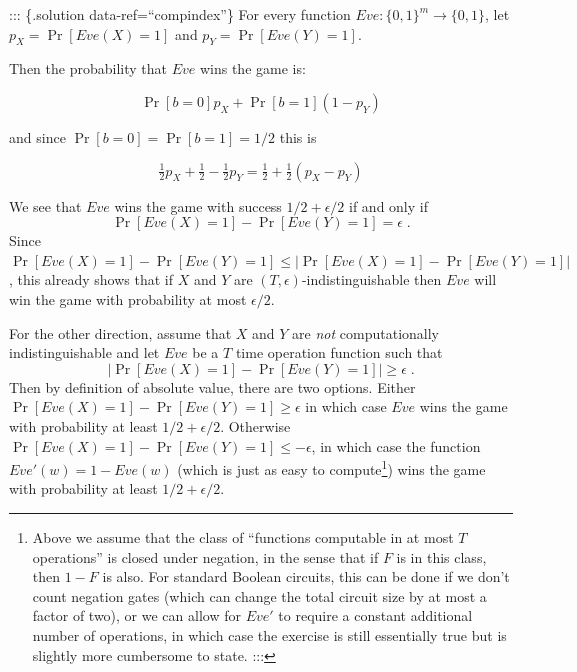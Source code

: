 
::: \{.solution data-ref=``compindex''\} For every function
\(Eve:\{0,1\}^m \rightarrow \{0,1\}\), let \(p_X = \Pr[ Eve(X)=1]\) and
\(p_Y = \Pr[Eve(Y)=1]\).

Then the probability that \(Eve\) wins the game is:

\begin{equation*}
\Pr[ b=0] p_X + \Pr[b=1](1-p_Y)
\end{equation*}

and since \(\Pr[b=0]=\Pr[b=1]=1/2\) this is

\begin{equation*}
\tfrac{1}{2}p_X + \tfrac{1}{2} - \tfrac{1}{2}p_Y = \tfrac{1}{2} + \tfrac{1}{2}(p_X-p_Y)
\end{equation*}

We see that \(Eve\) wins the game with success \(1/2 + \epsilon/2\) if
and only if
\begin{equation*}
\Pr[ Eve(X) = 1 ] - \Pr[Eve(Y)=1]  = \epsilon \;.
\end{equation*}
Since
\(\Pr[ Eve(X) = 1 ] - \Pr[Eve(Y)=1] \leq \left| \Pr[ Eve(X) = 1 ] - \Pr[Eve(Y)=1] \right|\),
this already shows that if \(X\) and \(Y\) are
\((T,\epsilon)\)-indistinguishable then \(Eve\) will win the game with
probability at most \(\epsilon/2\).

For the other direction, assume that \(X\) and \(Y\) are \emph{not}
computationally indistinguishable and let \(Eve\) be a \(T\) time
operation function such that
\begin{equation*}
\left| \Pr[ Eve(X) = 1 ] - \Pr[Eve(Y)=1]  \right| \geq \epsilon \;.
\end{equation*}
Then by definition of absolute value, there are two options. Either
\(\Pr[ Eve(X) = 1 ] - \Pr[Eve(Y)=1] \geq \epsilon\) in which case
\(Eve\) wins the game with probability at least \(1/2 + \epsilon/2\).
Otherwise \(\Pr[ Eve(X) = 1 ] - \Pr[Eve(Y)=1] \leq -\epsilon\), in which
case the function \(Eve'(w)=1-Eve(w)\) (which is just as easy to
compute\footnote{Above we assume that the class of ``functions
  computable in at most \(T\) operations'' is closed under negation, in
  the sense that if \(F\) is in this class, then \(1-F\) is also. For
  standard Boolean circuits, this can be done if we don't count negation
  gates (which can change the total circuit size by at most a factor of
  two), or we can allow for \(Eve'\) to require a constant additional
  number of operations, in which case the exercise is still essentially
  true but is slightly more cumbersome to state. :::}) wins the game
with probability at least \(1/2 + \epsilon/2\).

